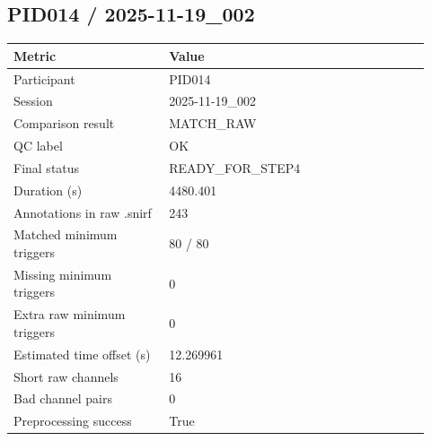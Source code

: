 \subsection*{PID014 / 2025-11-19\_002}
\begin{tabular}{p{0.34\linewidth}p{0.58\linewidth}}
\toprule
Metric & Value\\
\midrule
Participant & PID014\\
Session & 2025-11-19\_002\\
Comparison result & MATCH\_RAW\\
QC label & OK\\
Final status & READY\_FOR\_STEP4\\
Duration (s) & 4480.401\\
Annotations in raw .snirf & 243\\
Matched minimum triggers & 80 / 80\\
Missing minimum triggers & 0\\
Extra raw minimum triggers & 0\\
Estimated time offset (s) & 12.269961\\
Short raw channels & 16\\
Bad channel pairs & 0\\
Preprocessing success & True\\
\bottomrule
\end{tabular}
